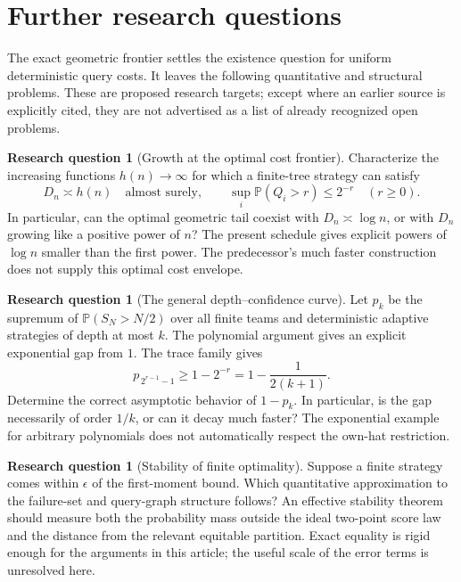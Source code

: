 \documentclass[11pt,letterpaper]{article}
\theoremstyle{definition}
\newcommand{\Prb}{\mathbb P}
\newtheorem{question}[theorem]{Research question}
\begin{document}
\section{Further research questions}
\label{mbg:insp:sec:questions}

The exact geometric frontier settles the existence question for
uniform deterministic query costs. It leaves the following quantitative
and structural problems. These are proposed research targets; except
where an earlier source is explicitly cited, they are not advertised
as a list of already recognized open problems.

\begin{question}[Growth at the optimal cost frontier]
Characterize the increasing functions \(h(n)\to\infty\) for which a
finite-tree strategy can satisfy
\[
 D_n\asymp h(n)\quad\text{almost surely},
 \qquad
 \sup_i\Prb(Q_i>r)\le2^{-r}\quad(r\ge0).
\]
In particular, can the optimal geometric tail coexist with
\(D_n\asymp\log n\), or with \(D_n\) growing like a positive power of
\(n\)? The present schedule gives explicit powers of \(\log n\) smaller
than the first power. The predecessor's much faster construction
\cite{qry:PriorHat} does not supply this optimal cost envelope.
\end{question}

\begin{question}[The general depth--confidence curve]
Let \(p_k\) be the supremum of
\(\Prb(S_N>N/2)\) over all finite teams and deterministic adaptive
strategies of depth at most \(k\).
The polynomial argument gives an explicit exponential gap from \(1\).
The trace family gives
\[
 p_{\,2^{r-1}-1}\ge1-2^{-r}
 =1-\frac{1}{2(k+1)}.
\]
Determine the correct asymptotic behavior of \(1-p_k\). In particular,
is the gap necessarily of order \(1/k\), or can it decay much faster?
The exponential example for arbitrary polynomials does not automatically
respect the own-hat restriction.
\end{question}

\begin{question}[Stability of finite optimality]
Suppose a finite strategy comes within \(\epsilon\) of the first-moment
bound. Which quantitative approximation to the failure-set and
query-graph structure follows? An effective stability theorem should
measure both the probability mass outside the ideal two-point score
law and the distance from the relevant equitable partition.
Exact equality is rigid enough for the arguments in this article;
the useful scale of the error terms is unresolved here.
\end{question}
\end{document}
